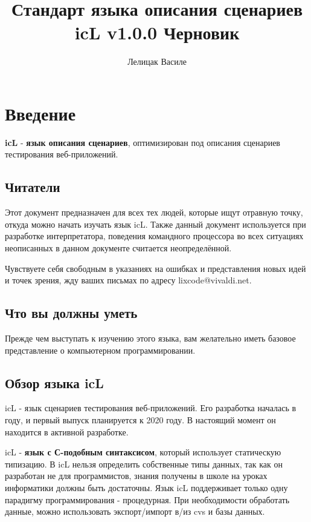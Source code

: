 \documentclass[a4paper, 14pt]{extarticle}
\begin{document}
\title{Стандарт языка описания сценариев icL v1.0.0 Черновик}
\author{Лелицак Василе}

\maketitle

\newpage
\renewcommand{\contentsname}{\textsf{Оглавление}}
\tableofcontents

\newpage

\section{Введение}

\indent \textbf{icL} - \textbf{язык описания сценариев}, оптимизирован под описания сценариев тестирования веб-приложений.

\subsection{Читатели}

Этот документ предназначен для всех тех людей, которые ищут отравную точку, откуда можно начать изучать язык icL. Также данный документ используется при разработке интерпретатора, поведения командного процессора во всех ситуациях неописанных в данном документе считается неопределённой.

Чувствуете себя свободным в указаниях на ошибках и представления новых идей и точек зрения, жду ваших письмах по адресу lixcode@vivaldi.net.

\subsection{Что вы должны уметь}

Прежде чем выступать к изучению этого языка, вам желательно иметь базовое представление о компьютерном программировании.

\subsection{Обзор языка icL}

icL - язык сценариев тестирования веб-приложений. Его разработка началась в году, и первый выпуск планируется к 2020 году. В настоящий момент он находится в активной разработке.

icL - \textbf{язык с С-подобным синтаксисом}, который использует статическую типизацию. В icL нельзя определить собственные типы данных, так как он разработан не для программистов, знания получены в школе на уроках информатики должны быть достаточны. Язык icL поддерживает только одну парадигму программирования - процедурная. При необходимости обработать данные, можно использовать экспорт/импорт в/из cvs и базы данных.
\end{document}
